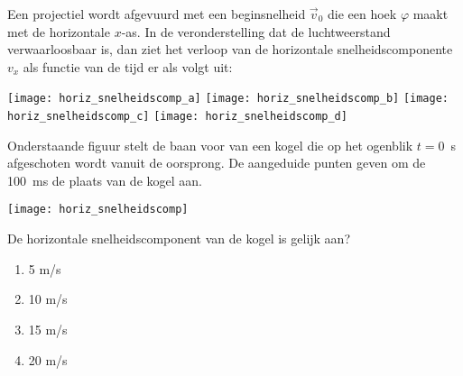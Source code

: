\documentclass{ximera}
\begin{document}
\begin{exercise} Een projectiel wordt afgevuurd met een beginsnelheid
$\vec{v}_0$ die een hoek $\varphi$ maakt met de horizontale
\mbox{$x$-as}.
In de veronderstelling dat de luchtweerstand verwaarloosbaar is, dan
ziet het verloop van de horizontale snelheidscomponente $v_x$ als
functie van de tijd er als volgt uit:
\begin{flushright}
\texttt{[image: horiz\_snelheidscomp\_a]}
\texttt{[image: horiz\_snelheidscomp\_b]}
\texttt{[image: horiz\_snelheidscomp\_c]}
\texttt{[image: horiz\_snelheidscomp\_d]}
\end{flushright}

\end{exercise}

\begin{exercise} Onderstaande figuur stelt de baan voor van
een kogel die op het ogenblik \mbox{$t=0$~s} afgeschoten wordt
vanuit de oorsprong. De aangeduide punten geven om de \mbox{100 ms}
de plaats van de kogel aan.
\begin{center}
\texttt{[image: horiz\_snelheidscomp]}
\end{center}


De horizontale snelheidscomponent van de kogel is gelijk aan?
\begin{enumerate}
\item 5 m/s
\item 10 m/s
\item 15 m/s
\item 20 m/s
\end{enumerate}

\end{exercise}
\end{document}
